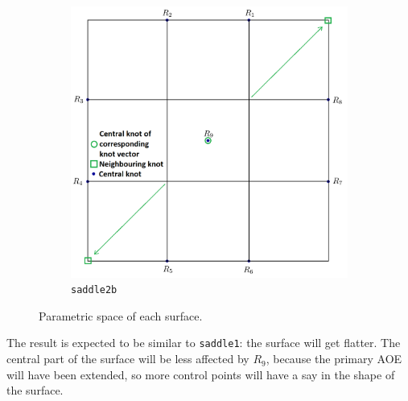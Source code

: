 \documentclass{article}
\begin{document}
\begin{figure}[H]
\begin{subfigure}[b]{0.48\textwidth}
\includegraphics[width=\textwidth]{saddle2bparam}
\caption{\texttt{saddle2b}}
\label{saddle2bp}
\end{subfigure}
\caption{Parametric space of each surface.}
\label{saddle2p}
\end{figure}

The result is expected to be similar to \texttt{saddle1}: the surface will get flatter. The central part of the surface will be less affected by $R_9$, because the primary AOE will have been extended, so more control points will have a say in the shape of the surface.
\end{document}
